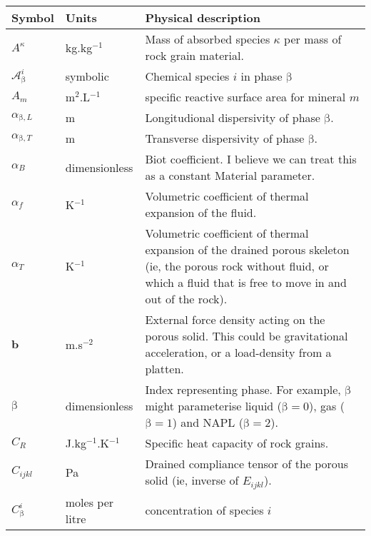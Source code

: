 \documentclass[12pt]{report}
\def\species{\kappa}
\def\phase{\mathrm{\beta}}
\begin{document}
\begin{longtable}{llp{10cm}}
\hline
{\bf Symbol} & {\bf Units} & {\bf Physical description} \\
\hline\hline
\endhead
$A^{\species}$ & kg.kg$^{-1}$ & Mass of absorbed species $\species$
per mass of rock grain material. \\
$\mathcal{A}^{i}_{\phase}$ & symbolic & Chemical species $i$ in phase $\phase$ \\

$A_{m}$ & m$^{2}$.L$^{-1}$ & specific reactive surface area for
mineral $m$ \\

$\alpha_{\phase,L}$ & m & Longitudional dispersivity of phase
$\phase$. \\

$\alpha_{\phase,T}$ & m & Transverse dispersivity of phase
$\phase$. \\

$\alpha_{B}$ & dimensionless & Biot coefficient.  I believe we can
treat this as a constant Material parameter. \\

$\alpha_{f}$ & K$^{-1}$ & Volumetric coefficient of thermal expansion
of the fluid.  \\

$\alpha_{T}$ & K$^{-1}$ & Volumetric coefficient of thermal expansion
of the drained porous skeleton (ie, the porous rock without fluid, or
which a fluid that is free to move in and out of the rock). \\

${\mathbf b}$ & m.s$^{-2}$ & External force density acting on the
porous solid.  This could be gravitational acceleration, or a
load-density from a platten. \\

$\phase$ & dimensionless & Index representing phase.  For example, $\phase$ might
parameterise liquid ($\phase=0$), gas ($\phase=1$) and NAPL ($\phase=2$). \\

$C_{R}$ & J.kg$^{-1}$.K$^{-1}$ & Specific heat capacity of rock
grains. \\

$C_{ijkl}$ & Pa & Drained compliance tensor of the porous solid (ie,
inverse of $E_{ijkl}$). \\

$C_{\phase}^{i}$ & moles per litre & concentration of species $i$ \\


\end{longtable}
\end{document}
